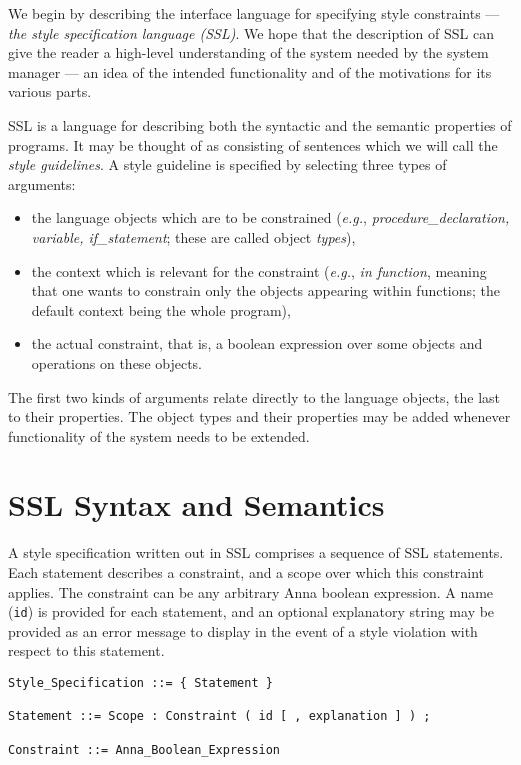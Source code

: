 We begin by describing the interface language for specifying style 
constraints --- {\em the style specification language (SSL)}.
We hope that the description of SSL can give the reader a high-level 
understanding of the system needed by the system manager --- an idea
 of the intended functionality and of the motivations for its various parts.

SSL is a language for describing both the syntactic and the semantic
properties of programs. It may be thought of as consisting of sentences
which we will call the {\em style guidelines}.  A style guideline is
specified by selecting three types of arguments:

\begin{itemize}
\item
the language objects which are to be constrained
({\em e.g.}, {\it procedure\_declaration, variable, if\_statement};
these are called object {\em types}),
\item
the context which is relevant for the constraint
({\em e.g.}, {\it in function}, meaning that one wants to constrain only
the objects appearing within functions; the default context being the
whole program),
\item
the actual constraint, that is, a boolean expression over some objects
and operations on these objects.
\end{itemize}

The first two kinds of arguments relate directly to the language
objects, the last to their properties.  The object types and their
properties may be added whenever functionality of the system needs to
be extended.

\section{SSL Syntax and Semantics}

A style specification written out in SSL comprises a sequence of SSL
statements.  Each statement describes a constraint, and a scope over
which this constraint applies.  The constraint can be any arbitrary
Anna boolean expression.  A name ({\tt id}) is provided
for each statement, and an optional explanatory string may
be provided as an error message to display in the event of a style
violation with respect to this statement.

\begin{verbatim}
Style_Specification ::= { Statement }

Statement ::= Scope : Constraint ( id [ , explanation ] ) ;

Constraint ::= Anna_Boolean_Expression
\end{verbatim}

